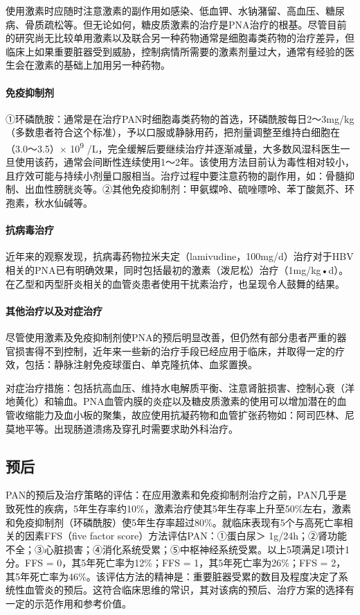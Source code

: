 使用激素时应随时注意激素的副作用如感染、低血钾、水钠潴留、高血压、糖尿病、骨质疏松等。但无论如何，糖皮质激素的治疗是PNA治疗的根基。尽管目前的研究尚无比较单用激素以及联合另一种药物通常是细胞毒类药物的治疗差异，但临床上如果重要脏器受到威胁，控制病情所需要的激素剂量过大，通常有经验的医生会在激素的基础上加用另一种药物。

\paragraph{免疫抑制剂}

①环磷酰胺：通常是在治疗PAN时细胞毒类药物的首选，环磷酰胺每日2～3mg/kg（多数患者符合这个标准），予以口服或静脉用药，把剂量调整至维持白细胞在（3.0～3.5）×
10\textsuperscript{9}
/L，完全缓解后要继续治疗并逐渐减量，大多数风湿科医生一旦使用该药，通常会间断性连续使用1～2年。该使用方法目前认为毒性相对较小，且疗效可能与持续小剂量口服相当。治疗过程中要注意药物的副作用，如：骨髓抑制、出血性膀胱炎等。②其他免疫抑制剂：甲氨蝶呤、硫唑嘌呤、苯丁酸氮芥、环孢素，秋水仙碱等。

\paragraph{抗病毒治疗}

近年来的观察发现，抗病毒药物拉米夫定（lamivudine，100mg/d）治疗对于HBV相关的PNA已有明确效果，同时包括最初的激素（泼尼松）治疗（1mg/kg•d）。在乙型和丙型肝炎相关的血管炎患者使用干扰素治疗，也呈现令人鼓舞的结果。

\paragraph{其他治疗以及对症治疗}

尽管使用激素及免疫抑制剂使PNA的预后明显改善，但仍然有部分患者严重的器官损害得不到控制，近年来一些新的治疗手段已经应用于临床，并取得一定的疗效，包括：静脉注射免疫球蛋白、单克隆抗体、血浆置换。

对症治疗措施：包括抗高血压、维持水电解质平衡、注意肾脏损害、控制心衰（洋地黄化）和输血。PNA血管内膜的炎症以及糖皮质激素的使用可以增加潜在的血管收缩能力及血小板的聚集，故应使用抗凝药物和血管扩张药物如：阿司匹林、尼莫地平等。出现肠道溃疡及穿孔时需要求助外科治疗。

\subsection{预后}

PAN的预后及治疗策略的评估：在应用激素和免疫抑制剂治疗之前，PAN几乎是致死性的疾病，5年生存率约10\%，激素治疗使其5年生存率上升至50\%左右，激素和免疫抑制剂（环磷酰胺）使5年生存率超过80\%。就临床表现有5个与高死亡率相关的因素FFS（five
factor score）方法评估PAN：①蛋白尿＞
1g/24h；②肾功能不全；③心脏损害；④消化系统受累；⑤中枢神经系统受累。以上5项满足1项计1分。FFS
= 0，其5年死亡率为12\%；FFS = 1，其5年死亡率为26\%；FFS =
2，其5年死亡率为46\%。该评估方法的精神是：重要脏器受累的数目及程度决定了系统性血管炎的预后。这符合临床思维的常识，其对该病的预后、治疗方案的选择有一定的示范作用和参考价值。

